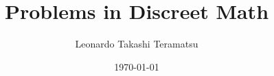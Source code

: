 \documentclass[a4paper, 12pt]{book}
\theoremstyle{remark}
\theoremstyle{proposition}
\theoremstyle{definition}
\begin{document}
\title{Problems in Discreet Math}
\author{Leonardo Takashi Teramatsu}
\date{\today}

\maketitle

\tableofcontents
\newpage %



\end{document}
